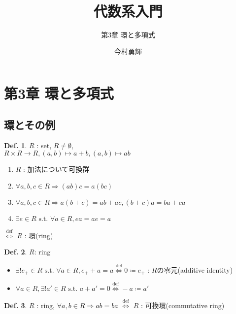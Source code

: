 \documentclass[uplatex,dvipdfmx,9pt]{beamer}
\title{代数系入門}
\subtitle{第3章 環と多項式}
\author{今村勇輝}
\newcommand{\defarrow}{\overset{\mathrm{def}}{\Leftrightarrow}}
\newcommand{\st}{\text{ s.t. }}
\newcommand{\sscount}{\textsection \thesubsection}
\newcounter{textExmCount}
\theoremstyle{definition} %
\newtheorem{defn}{Def.}[subsection] %
\theoremstyle{example}
\begin{document}
\begin{frame}[plain]
  \titlepage
\end{frame}

\section{第3章 環と多項式}

\subsection{\sscount 環とその例}
\setcounter{textExmCount}{0}

\begin{frame}

  \begin{defn}
    $R$ : set, $R \ne \emptyset$, \\
    $R \times R \to R, (a, b) \mapsto a + b, (a, b) \mapsto ab$
    \begin{enumerate}
      \item $R$ : 加法について可換群
      \item $\forall a, b, c \in R \Rightarrow (ab)c = a(bc)$
      \item $\forall a, b, c \in R \Rightarrow a(b + c) = ab + ac, (b + c)a = ba + ca$
      \item $\exists e \in R \st \forall a \in R, ea = ae = a$
    \end{enumerate}
    $\defarrow$ $R$ : \alert{環(ring)}
  \end{defn}

  \begin{defn}
    $R$: ring \\
    \begin{itemize}
      \item $\exists! e_+ \in R \st \forall a \in R, e_+ + a = a \defarrow 0 \coloneqq e_+$ : $R$の\alert{零元(additive identity)}
      \item $\forall a \in R, \exists! a' \in R \st a + a' = 0 \defarrow -a \coloneqq a'$
    \end{itemize}
  \end{defn}

  \begin{defn}
    $R$ : ring, $\forall a, b \in R \Rightarrow ab = ba$ $\defarrow$ $R$ : \alert{可換環(commutative ring)}
  \end{defn}

\end{frame}
\end{document}
